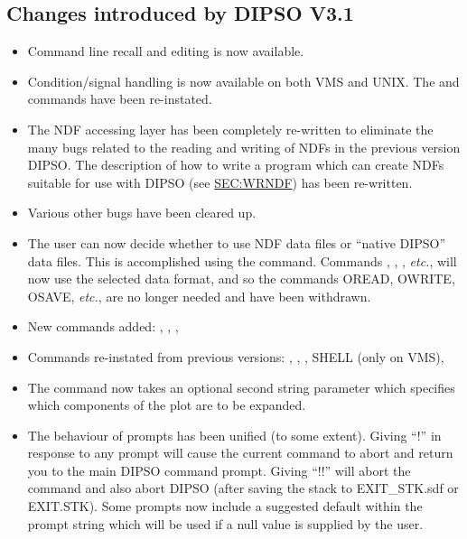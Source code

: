\subsection{Changes introduced by DIPSO V3.1}
\begin{itemize}

\item Command line recall and editing is now available.

\item Condition/signal handling is now available on both VMS and UNIX.
The   and   commands have been re-instated.

\item The NDF accessing layer has been completely re-written to
eliminate the many bugs related to the reading and writing of NDFs in
the previous version DIPSO. The description of how to write a program
which can create NDFs suitable for use with DIPSO (see 
\hyperref{earlier}{section}{}{SEC:WRNDF}) has been re-written.

\item Various other bugs have been cleared up.

\item The user can now decide whether to use NDF data files or ``native
DIPSO'' data files. This is accomplished using the   command.
Commands ,  ,  ,  {\em etc.}, will now use the selected data
format, and so the commands OREAD, OWRITE, OSAVE, {\em etc.}, are no
longer needed and have been withdrawn.

\item New commands added: ,  ,  ,   

\item Commands re-instated from previous versions: ,  , 
,  SHELL (only on VMS),

\item The   command now takes an optional second string parameter
which specifies which components of the plot are to be expanded.

\item The behaviour of prompts has been unified (to some extent).
Giving ``!'' in response to any prompt will cause the current command to
abort and return you to the main DIPSO command prompt. Giving ``!!'' will
abort the command and also abort DIPSO (after saving the stack to
EXIT\_STK.sdf or EXIT.STK). Some prompts now include a suggested default
within the prompt string which will be used if a null value is supplied
by the user.


\end{itemize}
